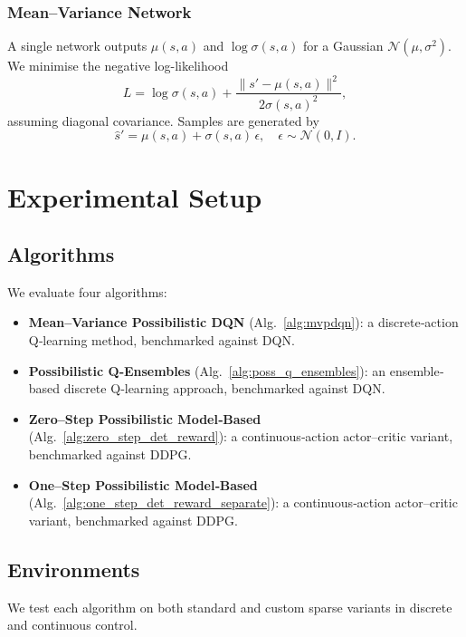 \documentclass[11pt,a4paper]{report}
\begin{document}
\subsection{Mean–Variance Network}
A single network outputs \(\mu(s,a)\) and \(\log\sigma(s,a)\) for a Gaussian \(\mathcal N(\mu,\sigma^2)\). We minimise the negative log-likelihood
\[
  L = \log\sigma(s,a) + \frac{\|s' - \mu(s,a)\|^2}{2\sigma(s,a)^2},
\]
assuming diagonal covariance. Samples are generated by
\[ \hat{s}' = \mu(s,a) + \sigma(s,a)\,\epsilon,\quad \epsilon \sim \mathcal N(0,I). \]

\chapter{Experimental Setup}
\label{chapter:es}

\section{Algorithms}
We evaluate four algorithms:

\begin{itemize}
  \item \textbf{Mean–Variance Possibilistic DQN} (Alg.~\ref{alg:mvpdqn}): a discrete‐action Q‐learning method, benchmarked against DQN.
  \item \textbf{Possibilistic Q‐Ensembles} (Alg.~\ref{alg:poss_q_ensembles}): an ensemble‐based discrete Q‐learning approach, benchmarked against DQN.
  \item \textbf{Zero–Step Possibilistic Model‐Based} (Alg.~\ref{alg:zero_step_det_reward}): a continuous‐action actor–critic variant, benchmarked against DDPG.
  \item \textbf{One–Step Possibilistic Model‐Based} (Alg.~\ref{alg:one_step_det_reward_separate}): a continuous‐action actor–critic variant, benchmarked against DDPG.
\end{itemize}

\section{Environments}
We test each algorithm on both standard and custom sparse variants in discrete and continuous control.
\end{document}
